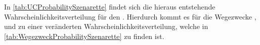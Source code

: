 

In \autoref{tab:UCProbabilitySzenarette} findet sich die hieraus entstehende Wahrscheinlichkeitsverteilung für den \UC \Firmeparkplatzdot.
Hierdurch kommt es für die Wegezwecke \Arbeitdot, \dienst und \Ausbildung zu einer veränderten Wahrscheinlichkeitsverteilung, welche in \autoref{tab:WegezweckProbabilitySzenarette} zu finden ist.




\clearpage
